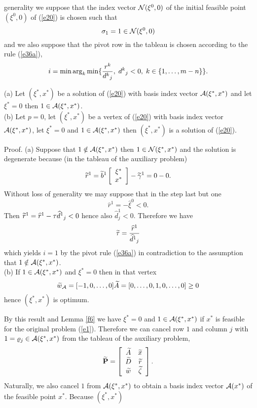 generality we suppose that the index vector $\N(\xi ^0, 0)$ of the initial
feasible point $(\xi ^0, 0)$ of (\ref{e20}) is chosen such that
\[
\sigma _1 = 1 \in \N(\xi ^0, 0)
\]
and we also suppose that the pivot row in the tableau is chosen according to
the rule (\ref{e36a}),
\[
i = \dis \min \arg_k \min \{\frac{r^k}
{d^k{}_j}, \; d^k{}_j < 0, \; k \in \{1, \ldots, m - n \}\}.
\]
%
\begin{theorem} \label{tev1} (a)
Let $(\xi ^*, x^*)$ be a solution of (\ref{e20}) with basis index vector
$\A(\xi ^*,x^*)$ and let $\xi ^* = 0$ then $1 \in \A(\xi ^*,x^*)$.\\
(b)
Let $p = 0$, let $(\xi ^*, x^*)$ be a vertex of (\ref{e20}) with basis index
vector $\A(\xi ^*,x^*)$, let $\xi ^* = 0$ and $1 \in \A(\xi ^*,x^*)$
then $(\xi ^*,x^*)$ is a solution of (\ref{e20}).
\end{theorem}
%
Proof. (a) Suppose that $1 \notin \A(\xi ^*,x^*)$ then $1 \in \N(\xi ^*,x^*)$
and the solution is degenerate because (in the tableau of the auxiliary
problem)
\[
\wi{r}^1 = \wi{b}^1\ba{[}{c}\xi ^*\\x^*\ea{]} - \wi{\gamma }^1 = 0 - 0 .
\]
Without loss of generality we may suppose that in the step last but one
\[
\widehat{r}^1 = - \widehat{\xi }^0 < 0.
\]
Then $\wi{r}^1 = \widehat{r}^1 - \tau \widehat{d}^1{}_j < 0$ hence
also $\widehat{d}^1_j < 0$. Therefore we have
\[
\wi{\tau}  = \frac{\widehat{r}^1}{\widehat{d}^1{}_j}
\]
which yields $i = 1$ by the pivot rule (\ref{e36a}) in contradiction to the
assumption that $1 \notin \A(\xi ^*,x^*)$.\\
(b) If $1 \in \A(\xi ^*,x^*)$ and $\xi ^* = 0$ then in that vertex
\[
\wi{w}_{\A} = [-1, 0, \ldots,0]\wi{A} = [0, \ldots,0,1,0,\ldots,0] \geq 0
\]
hence $(\xi ^*,x^*)$ is optimum.\\
\par
By this result and Lemma \ref{f6} we have $\xi ^* = 0$ and $1 \in \A(\xi
^*,x^*)$ if $x^*$ is feasible for the original problem (\ref{e1}).  Therefore
we can cancel row $1$ and column $j$ with $1 = \rho _j \in \A(\xi ^*,x^*)$ from
the tableau of the auxiliary problem,
\begin{equation} \label{vt4}
\wi{\bf P} = \ba{[}{cc} \wi{A} &  \wi{x}\\ \wi{D} & \wi{r}\\
\wi{w} & \wi{\zeta } \ea{]}.
\end{equation}
Naturally, we also cancel  $1$ from $\A(\xi ^*,x^*)$ to obtain a basis
index vector $\A(x^*)$ of the feasible point $x^*$. Because $(\xi ^*,x^*)$
